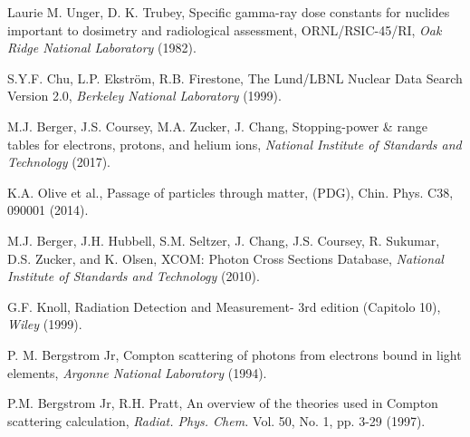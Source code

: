 \begin{thebibliography}{99} %

Laurie M. Unger, D. K. Trubey, Specific gamma-ray dose constants for nuclides important to dosimetry and radiological assessment, ORNL/RSIC-45/RI, \emph{Oak Ridge National Laboratory} (1982).

S.Y.F. Chu, L.P. Ekström, R.B. Firestone, The Lund/LBNL Nuclear Data Search Version 2.0, \emph{Berkeley National Laboratory} (1999).

M.J. Berger, J.S. Coursey, M.A. Zucker, J. Chang, Stopping-power \& range tables for electrons, protons, and helium ions, \emph{National Institute of Standards and Technology} (2017).

K.A. Olive et al., Passage of particles through matter, (PDG), Chin. Phys. C38, 090001 (2014).

M.J. Berger, J.H. Hubbell, S.M. Seltzer, J. Chang, J.S. Coursey, R. Sukumar, D.S. Zucker, and K. Olsen, XCOM: Photon Cross Sections Database, \emph{National Institute of Standards and Technology} (2010).

G.F. Knoll, Radiation Detection and Measurement- 3rd edition (Capitolo 10), \emph{Wiley} (1999).

P. M. Bergstrom Jr, Compton scattering of photons from electrons bound in light elements, \emph{Argonne National Laboratory} (1994).

P.M. Bergstrom Jr, R.H. Pratt, An overview of the theories used in Compton scattering calculation, \emph{Radiat. Phys. Chem.} Vol. 50, No. 1, pp. 3-29 (1997).

\end{thebibliography}
